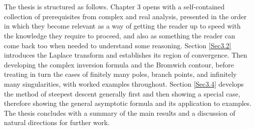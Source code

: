 \\
\\
The thesis is structured as follows. Chapter 3 opens with a self-contained collection of prerequisites from complex and real analysis, presented in the order in which they become relevant as a way of getting the reader up to speed with the knowledge they require to proceed, and also as something the reader can come back too when needed to understand some reasoning. Section \ref{Sec3.2} introduces the Laplace transform and establishes its region of convergence. Then developing the complex inversion formula and the Bromwich contour, before treating in turn the cases of finitely many poles, branch points, and infinitely many singularities, with worked examples throughout. Section \ref{Sec3.4} develops the method of steepest descent generally first and then showing a special case, therefore showing the general asymptotic formula and its application to examples. The thesis concludes with a summary of the main results and a discussion of natural directions for further work. 